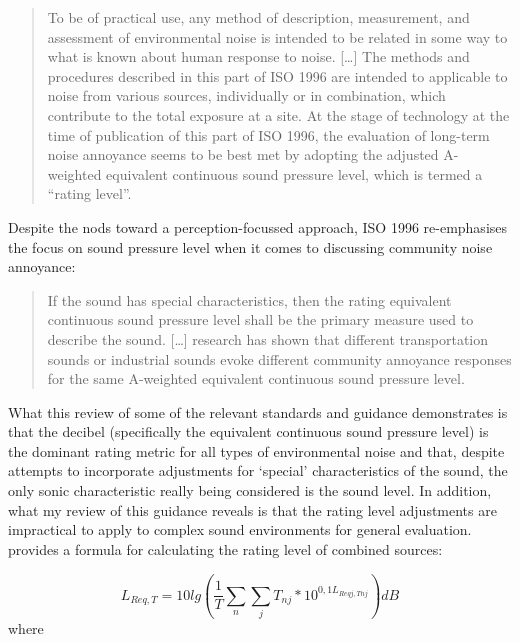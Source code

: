 \begin{quote}
  To be of practical use, any method of description, measurement, and assessment of environmental noise is intended to be related in some way to what is known about human response to noise. [\ldots] The methods and procedures described in this part of ISO 1996 are intended to applicable to noise from various sources, individually or in combination, which contribute to the total exposure at a site. At the stage of technology at the time of publication of this part of ISO 1996, the evaluation of long-term noise annoyance seems to be best met by adopting the adjusted A-weighted equivalent continuous sound pressure level, which is termed a ``rating level''. 
        \begin{flushright}
    \citet{ISO1996Part1}
  \end{flushright}
\end{quote}

Despite the nods toward a perception-focussed approach, ISO 1996 re-emphasises the focus on sound pressure level when it comes to discussing community noise annoyance:

\begin{quote}
  If the sound has special characteristics, then the rating equivalent continuous sound pressure level shall be the primary measure used to describe the sound. [\dots] research has shown that different transportation sounds or industrial sounds evoke different community annoyance responses for the same A-weighted equivalent continuous sound pressure level.
        \begin{flushright}
    \citet[Sec. 6.1]{ISO1996Part1}
  \end{flushright}
\end{quote}

What this review of some of the relevant standards and guidance demonstrates is that the decibel (specifically the equivalent continuous sound pressure level) is the dominant rating metric for all types of environmental noise and that, despite attempts to incorporate adjustments for `special' characteristics of the sound, the only sonic characteristic really being considered is the sound level. In addition, what my review of this guidance reveals is that the rating level adjustments are impractical to apply to complex sound environments for general evaluation. \citet[Eq. 4]{ISO1996Part1} provides a formula for calculating the rating level of combined sources:

\begin{equation}
L_{Req,T} = 10lg \left(\frac{1}{T} \sum_n \sum_j T_{nj} * 10^{0,1L_{Reqj,Tnj}}  \right) dB
\label{eqn:iso1996Rating}
\end{equation}
where

